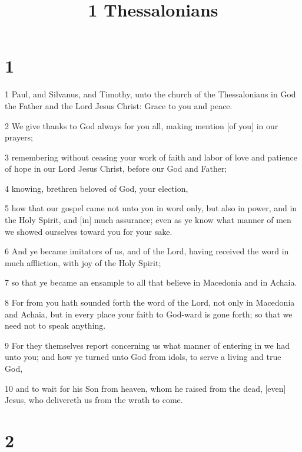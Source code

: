 

\title{1 Thessalonians}

\chapter{1}

\par 1 Paul, and Silvanus, and Timothy, unto the church of the Thessalonians in God the Father and the Lord Jesus Christ: Grace to you and peace.
\par 2 We give thanks to God always for you all, making mention [of you] in our prayers;
\par 3 remembering without ceasing your work of faith and labor of love and patience of hope in our Lord Jesus Christ, before our God and Father;
\par 4 knowing, brethren beloved of God, your election,
\par 5 how that our gospel came not unto you in word only, but also in power, and in the Holy Spirit, and [in] much assurance; even as ye know what manner of men we showed ourselves toward you for your sake.
\par 6 And ye became imitators of us, and of the Lord, having received the word in much affliction, with joy of the Holy Spirit;
\par 7 so that ye became an ensample to all that believe in Macedonia and in Achaia.
\par 8 For from you hath sounded forth the word of the Lord, not only in Macedonia and Achaia, but in every place your faith to God-ward is gone forth; so that we need not to speak anything.
\par 9 For they themselves report concerning us what manner of entering in we had unto you; and how ye turned unto God from idols, to serve a living and true God,
\par 10 and to wait for his Son from heaven, whom he raised from the dead, [even] Jesus, who delivereth us from the wrath to come.

\chapter{2}

